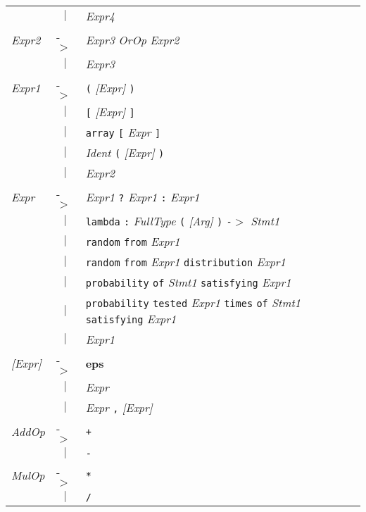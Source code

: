 \documentclass{article}
\begin{document}
\begin{center}
\begin{tabular}{lll}
 & \multicolumn{1}{c}{\textbf{$|$}} & \textit{Expr4} \\
\textit{Expr2} & -$>$ & \textit{Expr3} \textit{OrOp} \textit{Expr2} \\
 & \multicolumn{1}{c}{\textbf{$|$}} & \textit{Expr3} \\
\textit{Expr1} & -$>$ & \texttt{(} \textit{[Expr]} \texttt{)} \\
 & \multicolumn{1}{c}{\textbf{$|$}} & \texttt{[} \textit{[Expr]} \texttt{]} \\
 & \multicolumn{1}{c}{\textbf{$|$}} & \texttt{array} \texttt{[} \textit{Expr} \texttt{]} \\
 & \multicolumn{1}{c}{\textbf{$|$}} & \textit{Ident} \texttt{(} \textit{[Expr]} \texttt{)} \\
 & \multicolumn{1}{c}{\textbf{$|$}} & \textit{Expr2} \\
\textit{Expr} & -$>$ & \textit{Expr1} \texttt{?} \textit{Expr1} \texttt{:} \textit{Expr1} \\
 & \multicolumn{1}{c}{\textbf{$|$}} & \texttt{lambda} \texttt{:} \textit{FullType} \texttt{(} \textit{[Arg]} \texttt{)} \texttt{-$>$} \textit{Stmt1} \\
 & \multicolumn{1}{c}{\textbf{$|$}} & \texttt{random} \texttt{from} \textit{Expr1} \\
 & \multicolumn{1}{c}{\textbf{$|$}} & \texttt{random} \texttt{from} \textit{Expr1} \texttt{distribution} \textit{Expr1} \\
 & \multicolumn{1}{c}{\textbf{$|$}} & \texttt{probability} \texttt{of} \textit{Stmt1} \texttt{satisfying} \textit{Expr1} \\
 & \multicolumn{1}{c}{\textbf{$|$}} & \texttt{probability} \texttt{tested} \textit{Expr1} \texttt{times} \texttt{of} \textit{Stmt1} \texttt{satisfying} \textit{Expr1} \\
 & \multicolumn{1}{c}{\textbf{$|$}} & \textit{Expr1} \\
\textit{[Expr]} & -$>$ & \textbf{eps} \\
 & \multicolumn{1}{c}{\textbf{$|$}} & \textit{Expr} \\
 & \multicolumn{1}{c}{\textbf{$|$}} & \textit{Expr} \texttt{,} \textit{[Expr]} \\
\textit{AddOp} & -$>$ & \texttt{+} \\
 & \multicolumn{1}{c}{\textbf{$|$}} & \texttt{-} \\
\textit{MulOp} & -$>$ & \texttt{*} \\
 & \multicolumn{1}{c}{\textbf{$|$}} & \texttt{/} \\

\end{tabular}
\end{center}
\end{document}
